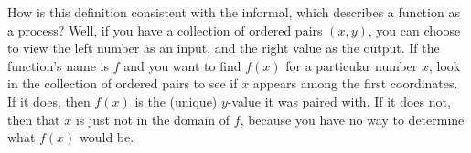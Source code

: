 \documentclass[noauthor, nooutcomes]{ximera}
\begin{document}
How is this definition consistent with the informal, which describes a function as a process? Well, if you have a collection of ordered pairs $(x,y)$, you can choose to view the left number as an input, and the right value as the output. If the function's name is $f$ and you want to find $f(x)$  for a particular number $x$, look in the collection of ordered pairs to see if $x$ appears among the first coordinates. If it does, then $f(x)$ is the (unique) $y$-value it was paired with. If it does not, then that $x$ is just not in the domain of $f$, because you have no way to determine what $f(x)$ would be.

%
%
%
%
\end{document}
